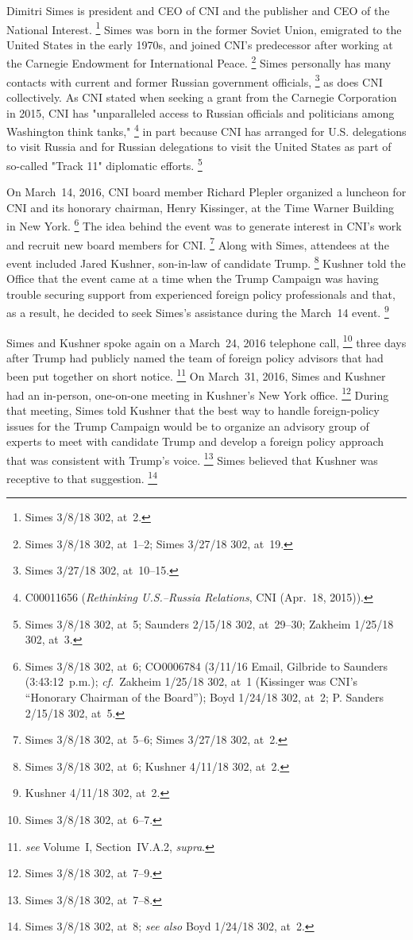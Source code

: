 Dimitri Simes is president and CEO of CNI and the publisher and CEO of the National Interest.%
\footnote{Simes 3/8/18 302, at~2.}
Simes was born in the former Soviet Union, emigrated to the United States in the early 1970s, and joined CNI's predecessor after working at the Carnegie Endowment for International Peace.%
\footnote{ Simes 3/8/18 302, at~1--2;
Simes 3/27/18 302, at~19.}
Simes personally has many contacts with current and former Russian government officials,%
\footnote{Simes 3/27/18 302, at~10--15.}
as does CNI collectively.
As CNI stated when seeking a grant from the Carnegie Corporation in 2015, CNI has "unparalleled access to Russian officials and politicians among Washington think tanks,"%
\footnote{C00011656 (\textit{Rethinking U.S.--Russia Relations}, CNI (Apr.~18, 2015)).}
in part because CNI has arranged for U.S. delegations to visit Russia and for Russian delegations to visit the United States as part of so-called "Track 11" diplomatic efforts.%
\footnote{Simes 3/8/18 302, at~5;
Saunders 2/15/18 302, at~29--30;
Zakheim 1/25/18 302, at~3.}

On March~14, 2016, CNI board member Richard Plepler organized a luncheon for CNI and its honorary chairman, Henry Kissinger, at the Time Warner Building in New York.%
\footnote{Simes 3/8/18 302, at~6;
CO0006784 (3/11/16 Email, Gilbride to Saunders (3:43:12~p.m.);
\textit{cf.}~Zakheim 1/25/18 302, at~1 (Kissinger was CNI's ``Honorary Chairman of the Board'');
Boyd 1/24/18 302, at~2;
P. Sanders 2/15/18 302, at~5.}
The idea behind the event was to generate interest in CNI's work and recruit new board members for CNI\null.%
\footnote{Simes 3/8/18 302, at~5--6; Simes 3/27/18 302, at~2.}
Along with Simes, attendees at the event included Jared Kushner, son-in-law of candidate Trump.%
\footnote{Simes 3/8/18 302, at~6; Kushner 4/11/18 302, at~2.}
Kushner told the Office that the event came at a time when the Trump Campaign was having trouble securing support from experienced foreign policy professionals and that, as a result, he decided to seek Simes's assistance during the March~14 event.%
\footnote{Kushner 4/11/18 302, at~2.}

Simes and Kushner spoke again on a March~24, 2016 telephone call,%
\footnote{Simes 3/8/18 302, at~6--7.}
three days after Trump had publicly named the team of foreign policy advisors that had been put together on short notice.%
\footnote{ \textit{see} Volume~I, Section~IV.A.2, \textit{supra}.}
On March~31, 2016, Simes and Kushner had an in-person, one-on-one meeting in Kushner's New York office.%
\footnote{Simes 3/8/18 302, at~7--9.}
During that meeting, Simes told Kushner that the best way to handle foreign-policy issues for the Trump Campaign would be to organize an advisory group of experts to meet with candidate Trump and develop a foreign policy approach that was consistent with Trump's voice.%
\footnote{Simes 3/8/18 302, at~7--8.}
Simes believed that Kushner was receptive to that suggestion.%
\footnote{Simes 3/8/18 302, at~8;
\textit{see also} Boyd 1/24/18 302, at~2.}

